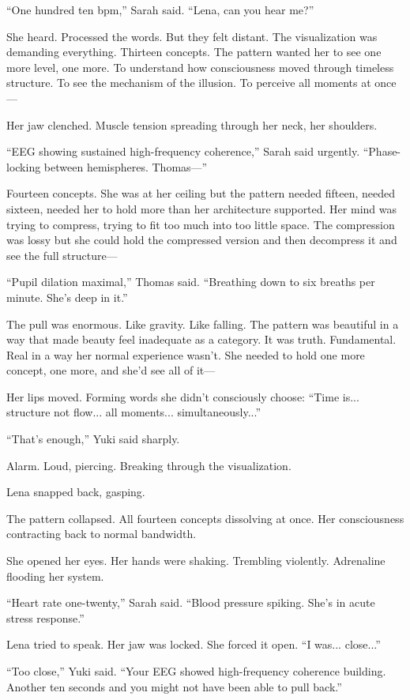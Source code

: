 ``One hundred ten bpm,'' Sarah said. ``Lena, can you hear me?''

She heard. Processed the words. But they felt distant. The visualization was demanding everything. Thirteen concepts. The pattern wanted her to see one more level, one more. To understand how consciousness moved through timeless structure. To see the mechanism of the illusion. To perceive all moments at once—

Her jaw clenched. Muscle tension spreading through her neck, her shoulders.

``EEG showing sustained high-frequency coherence,'' Sarah said urgently. ``Phase-locking between hemispheres. Thomas—''

Fourteen concepts. She was at her ceiling but the pattern needed fifteen, needed sixteen, needed her to hold more than her architecture supported. Her mind was trying to compress, trying to fit too much into too little space. The compression was lossy but she could hold the compressed version and then decompress it and see the full structure—

``Pupil dilation maximal,'' Thomas said. ``Breathing down to six breaths per minute. She's deep in it.''

The pull was enormous. Like gravity. Like falling. The pattern was beautiful in a way that made beauty feel inadequate as a category. It was truth. Fundamental. Real in a way her normal experience wasn't. She needed to hold one more concept, one more, and she'd see all of it—

Her lips moved. Forming words she didn't consciously choose: ``Time is... structure not flow... all moments... simultaneously...''

``That's enough,'' Yuki said sharply.

Alarm. Loud, piercing. Breaking through the visualization.

Lena snapped back, gasping.

The pattern collapsed. All fourteen concepts dissolving at once. Her consciousness contracting back to normal bandwidth.

She opened her eyes. Her hands were shaking. Trembling violently. Adrenaline flooding her system.

``Heart rate one-twenty,'' Sarah said. ``Blood pressure spiking. She's in acute stress response.''

Lena tried to speak. Her jaw was locked. She forced it open. ``I was... close...''

``Too close,'' Yuki said. ``Your EEG showed high-frequency coherence building. Another ten seconds and you might not have been able to pull back.''

